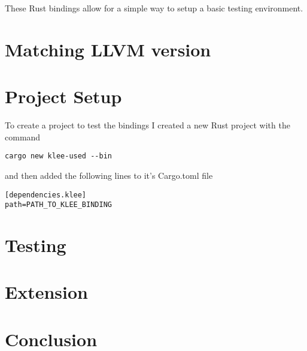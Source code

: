 \documentclass{report}
\begin{document}
These Rust bindings allow for a simple way to setup a basic testing environment.

\chapter {Matching LLVM version}



\chapter {Project Setup}

To create a project to test the bindings I created a new Rust project with the command
\begin{lstlisting}
cargo new klee-used --bin
\end{lstlisting}

and then added the following lines to it's Cargo.toml file
\begin{lstlisting}
[dependencies.klee]
path=PATH_TO_KLEE_BINDING
\end{lstlisting}

\chapter {Testing}
\chapter {Extension}
\chapter {Conclusion}
\end{document}
